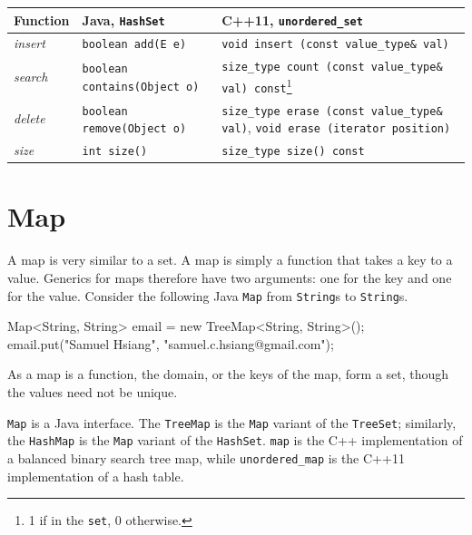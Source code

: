 \begin{center}
    \begin{tabular}{ | p{5cm} | p{5cm} | p{5cm} | }
      \hline
      \textbf{Function}	&	\textbf{Java, \texttt{HashSet}}	&	\textbf{C++11, \texttt{unordered\_set}} \\ \hline
      \textit{insert}		&	\texttt{boolean add(E e)}	&	\texttt{void insert (const value\_type\& val)} \\ \hline
      \textit{search}		&	\texttt{boolean contains(Object o)}	&	\texttt{size\_type count (const value\_type\& val) const}\footnote{1 if in the \texttt{set}, 0 otherwise.}	\\ \hline
      \textit{delete}		&	\texttt{boolean	remove(Object o)}		&	\texttt{size\_type erase (const value\_type\& val)}, \texttt{void erase (iterator position)} \\ \hline
      \textit{size} & \texttt{int size()} & \texttt{size\_type size() const} \\ \hline
    \end{tabular}
  \end{center}

\section{Map}

A map is very similar to a set. A map is simply a function that takes a key to a value. Generics for maps therefore have two arguments: one for the key and one for the value. Consider the following Java \texttt{Map} from \texttt{String}s to \texttt{String}s.

\begin{mylstlisting}
Map<String, String> email = new TreeMap<String, String>();
email.put("Samuel Hsiang", "samuel.c.hsiang@gmail.com");
\end{mylstlisting}

As a map is a function, the domain, or the keys of the map, form a set, though the values need not be unique.

\texttt{Map} is a Java interface. The \texttt{TreeMap} is the \texttt{Map} variant of the \texttt{TreeSet}; similarly, the \texttt{HashMap} is the \texttt{Map} variant of the \texttt{HashSet}. \texttt{map} is the C++ implementation of a balanced binary search tree map, while \texttt{unordered\_map} is the C++11 implementation of a hash table.

